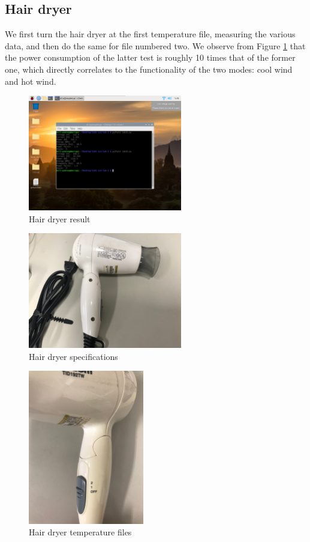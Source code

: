 \documentclass[12pt, a4paper, onside]{article}
\begin{document}
\subsection{Hair dryer}
We first turn the hair dryer at the first temperature file, measuring the various data, and then do the same for file numbered two. We observe from Figure \ref{hair-dryer} that the power consumption of the latter test is roughly 10 times that of the former one, which directly correlates to the functionality of the two modes: cool wind and hot wind.
\begin{figure}[h]
  \centering
  \includegraphics[width=0.6\textwidth]{img/1_res_hair_dryer_temp_file_1_then_2}
  \caption{Hair dryer result}
  \label{hair-dryer}
\end{figure}
\begin{figure}[h]
  \centering
  \includegraphics[width=0.6\textwidth]{img/1_spe_hair_dryer}
  \caption{Hair dryer specifications}
\end{figure}
\begin{figure}[h]
  \centering
  \includegraphics[angle=-90, origin=c, width=0.45\textwidth]{img/1_pic_hair_dryer_temp_file}
  \caption{Hair dryer temperature files}
\end{figure}
\end{document}
